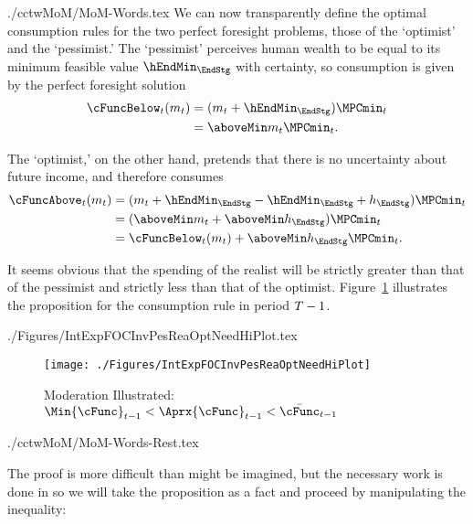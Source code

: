 \documentclass[SolvingMicroDSOPs]{subfiles}
\begin{document}
\begin{verbatimwrite}{./cctwMoM/MoM-Words.tex}
  We can now transparently define the optimal
  consumption rules for the two perfect foresight problems, those of the
  `optimist' and the `pessimist.'  The `pessimist' perceives human
  wealth to be equal to its minimum feasible value $\hEndMin_{\EndStg}$ with certainty, so
  consumption is given by the perfect foresight solution
  \begin{equation*}\begin{gathered}\begin{aligned}
        \cFuncBelow_{\prd}(m_{\prd})  & = (m_{\prd}+\hEndMin_{\EndStg})\MPCmin_{\prd}
        \\  & = \aboveMin \mNrm_{\prd}\MPCmin_{\prd}
        .
      \end{aligned}\end{gathered}\end{equation*}

  The `optimist,' on the other hand, pretends that there is no uncertainty
  about future income, and therefore consumes
  \begin{equation*}\begin{gathered}\begin{aligned}
        \cFuncAbove_{\prd}(m_{\prd})  & = (m_{\prd} +\hEndMin_{\EndStg} - \hEndMin_{\EndStg} + \hNrm_{\EndStg} )\MPCmin_{\prd}
        \\    & = (\aboveMin \mNrm_{\prd} + \aboveMin \hNrm_{\EndStg})\MPCmin_{\prd}
        \\      & = \cFuncBelow_{\prd}(m_{\prd})+\aboveMin \hNrm_{\EndStg} \MPCmin_{\prd}
        .
      \end{aligned}\end{gathered}\end{equation*}

  It seems obvious that the spending of the realist will be strictly greater
  than that of the pessimist and strictly less than that of the
  optimist.  Figure~\ref{fig:IntExpFOCInvPesReaOptNeedHiPlot} illustrates the proposition for the consumption rule in period $T-1$.
\end{verbatimwrite}
\unskip
\begin{verbatimwrite}{./Figures/IntExpFOCInvPesReaOptNeedHiPlot.tex}
  \hypertarget{IntExpFOCInvPesReaOptNeedHiPlot}{}
  \begin{figure}
    \texttt{[image: ./Figures/IntExpFOCInvPesReaOptNeedHiPlot]}
    \caption{Moderation Illustrated: $\Min{\cFunc}_{\prd-1} < \Aprx{\cFunc}_{\prd-1} < \bar{\cFunc}_{\prd-1}$}
    \label{fig:IntExpFOCInvPesReaOptNeedHiPlot}
  \end{figure}
\end{verbatimwrite}
\unskip
\begin{verbatimwrite}{./cctwMoM/MoM-Words-Rest.tex}

  \indent The proof is more difficult than might be imagined, but
  the necessary work is done in \cite{BufferStockTheory} so we will take
  the proposition as a fact and proceed by manipulating the inequality:
\end{verbatimwrite}
\unskip
\end{document}
